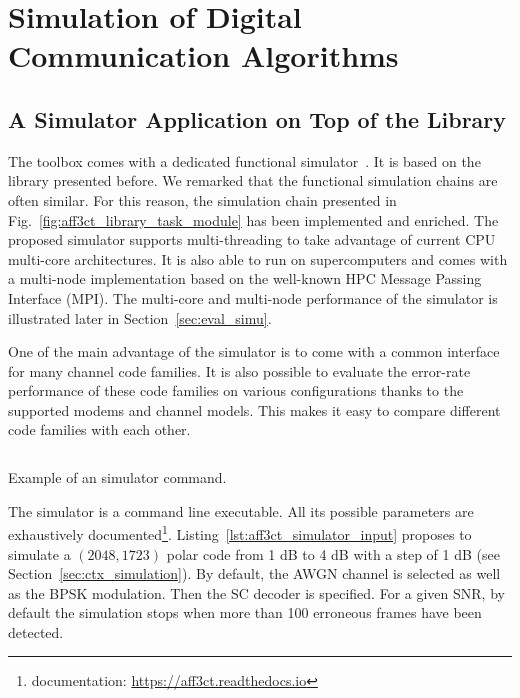\section{Simulation of Digital Communication Algorithms}

\subsection{A Simulator Application on Top of the Library}
\label{sec:aff3ct_simulator_example}

The \AFFECT toolbox comes with a dedicated functional
simulator~\cite{Cassagne2017}. It is based on the \AFFECT library presented
before. We remarked that the functional simulation chains are often similar. For
this reason, the simulation chain presented in
Fig.~\ref{fig:aff3ct_library_task_module} has been implemented and enriched. The
proposed simulator supports multi-threading to take advantage of current CPU
multi-core architectures. It is also able to run on supercomputers and comes
with a multi-node implementation based on the well-known HPC Message Passing
Interface (MPI). The multi-core and multi-node performance of the \AFFECT
simulator is illustrated later in Section~\ref{sec:eval_simu}.

One of the main advantage of the \AFFECT simulator is to come with a common
interface for many channel code families. It is also possible to evaluate the
error-rate performance of these code families on various configurations thanks
to the supported modems and channel models. This makes it easy to compare
different code families with each other.

\begin{listing}[htp]
  \inputminted[frame=lines]{bash}{\curChapter/src/use_cases/simulator/input.txt}
  \caption{Example of an \AFFECT simulator command.}
  \label{lst:aff3ct_simulator_input}
\end{listing}

The \AFFECT simulator is a command line executable. All its possible parameters
are exhaustively documented\footnote{\AFFECT documentation:
\url{https://aff3ct.readthedocs.io}}. Listing~\ref{lst:aff3ct_simulator_input}
proposes to simulate a $(2048,1723)$ polar code from 1 dB to 4 dB with a step of
1 dB (see Section~\ref{sec:ctx_simulation}). By default, the AWGN channel is
selected as well as the BPSK modulation. Then the SC decoder is specified. For a
given SNR, by default the simulation stops when more than 100 erroneous frames
have been detected.

